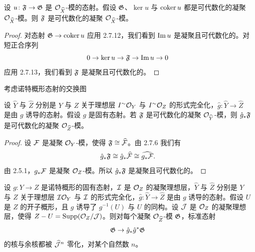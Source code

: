 \begin{lemma}\label{it:2.7.14}
设 $u\colon\mathfrak{F}\to\mathfrak{G}$ 是 $\mathcal{O}_{\widehat{X}}$-模的态射。假设 $\mathfrak{G}$、$\ker u$ 与 $\operatorname{coker} u$ 都是可代数化的凝聚 $\mathcal{O}_{\widehat{X}}$-模。则 $\mathfrak{F}$ 是可代数化的凝聚 $\mathcal{O}_{\widehat{X}}$-模。
\end{lemma}

\begin{proof}
对态射 $\mathfrak{G}\to\operatorname{coker} u$ 应用 2.7.12，我们看到 $\operatorname{Im} u$ 是凝聚且可代数化的。对短正合序列
\begin{equation*}
0\to\ker u\to\mathfrak{F}\to\operatorname{Im} u\to 0
\end{equation*}
应用 2.7.13，我们看到 $\mathfrak{F}$ 是凝聚且可代数化的。
\end{proof}

\begin{lemma}\label{it:2.7.15}
考虑诺特概形态射的交换图
\begin{center}
\end{center}
设 $\widehat{Y}$ 与 $\widehat{Z}$ 分别是 $Y$ 与 $Z$ 关于理想层 $I^{\sim}\mathcal{O}_Y$ 与 $I^{\sim}\mathcal{O}_Z$ 的形式完全化，$\hat{g}\colon\widehat{Y}\to\widehat{Z}$ 是由 $g$ 诱导的态射。假设 $g$ 是固有态射。若 $\mathfrak{F}$ 是可代数化的凝聚 $\mathcal{O}_{\widehat{Y}}$-模，则 $\hat{g}_*\mathfrak{F}$ 是可代数化的凝聚 $\mathcal{O}_{\widehat{Z}}$-模。
\end{lemma}

\begin{proof}
设 $\mathcal{F}$ 是凝聚 $\mathcal{O}_Y$-模，使得 $\mathfrak{F}\cong\widehat{\mathcal{F}}$。由 2.7.6 我们有
\begin{equation*}
\hat{g}_*\mathfrak{F}\cong\hat{g}_*\widehat{\mathcal{F}}\cong\widehat{g_*\mathcal{F}}.
\end{equation*}
由 2.5.1，$g_*\mathcal{F}$ 是凝聚 $\mathcal{O}_Z$-模。所以 $\hat{g}_*\mathfrak{F}$ 是凝聚且可代数化的。
\end{proof}

\begin{lemma}\label{it:2.7.16}
设 $g\colon Y\to Z$ 是诺特概形的固有态射，$\mathcal{I}$ 是 $\mathcal{O}_Z$ 的凝聚理想层，$\widehat{Y}$ 与 $\widehat{Z}$ 分别是 $Y$ 与 $Z$ 关于理想层 $\mathcal{I}\mathcal{O}_Y$ 与 $\mathcal{I}$ 的形式完全化，$\hat{g}\colon\widehat{Y}\to\widehat{Z}$ 是由 $g$ 诱导的态射。假设 $U$ 是 $Z$ 的开子概形，且 $g$ 诱导了 $g^{-1}(U)$ 与 $U$ 的同构。设 $\mathcal{J}$ 是 $\mathcal{O}_Z$ 的凝聚理想层，使得 $Z-U=\operatorname{Supp}(\mathcal{O}_Z/\mathcal{J})$。则对每个凝聚 $\mathcal{O}_{\widehat{Z}}$-模 $\mathfrak{G}$，标准态射
\begin{equation*}
\mathfrak{G}\to\hat{g}_*\hat{g}^*\mathfrak{G}
\end{equation*}
的核与余核都被 $\widehat{\mathcal{J}}^n$ 零化，对某个自然数 $n$。
\end{lemma}

